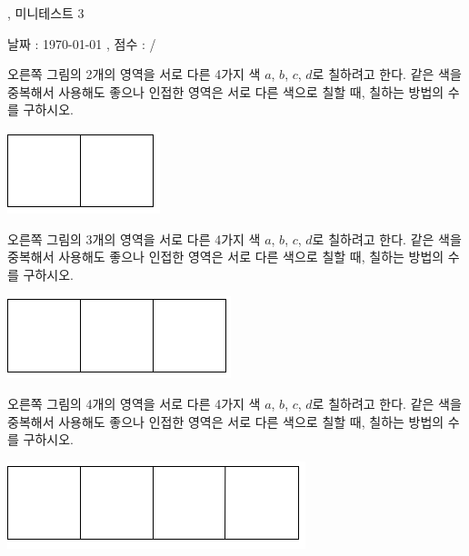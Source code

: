 \documentclass[a4paper]{oblivoir}
\begin{document}
\begin{center}
, 미니테스트 3
\end{center}
\begin{center}
날짜 : \today
,\qquad
점수 :  / 
\end{center}


%
\begin{minipage}{.65\textwidth}
\begin{Exercise}
오른쪽 그림의 2개의 영역을 서로 다른 4가지 색 \(a\), \(b\), \(c\), \(d\)로 칠하려고 한다.
같은 색을 중복해서 사용해도 좋으나 인접한 영역은 서로 다른 색으로 칠할 때, 칠하는 방법의 수를 구하시오.
\end{Exercise}
\end{minipage}
\quad
\begin{minipage}{.25\textwidth}
\includegraphics[width=.5\textwidth]{1}
\end{minipage}


%
\begin{minipage}{.65\textwidth}
\begin{Exercise}
오른쪽 그림의 3개의 영역을 서로 다른 4가지 색 \(a\), \(b\), \(c\), \(d\)로 칠하려고 한다.
같은 색을 중복해서 사용해도 좋으나 인접한 영역은 서로 다른 색으로 칠할 때, 칠하는 방법의 수를 구하시오.
\end{Exercise}
\end{minipage}
\quad
\begin{minipage}{.25\textwidth}
\includegraphics[width=.5\textwidth]{2}
\end{minipage}


%
\begin{minipage}{.65\textwidth}
\begin{Exercise}
오른쪽 그림의 4개의 영역을 서로 다른 4가지 색 \(a\), \(b\), \(c\), \(d\)로 칠하려고 한다.
같은 색을 중복해서 사용해도 좋으나 인접한 영역은 서로 다른 색으로 칠할 때, 칠하는 방법의 수를 구하시오.
\end{Exercise}
\end{minipage}
\quad
\begin{minipage}{.25\textwidth}
\includegraphics[width=.5\textwidth]{3}
\end{minipage}
\end{document}
